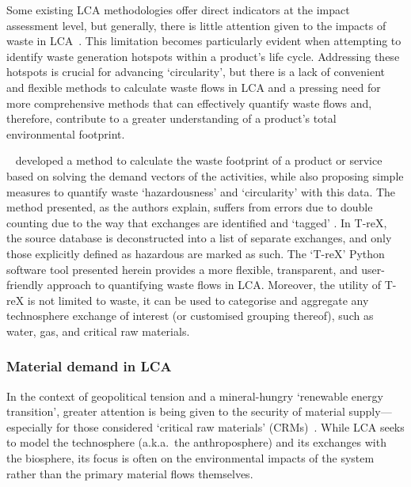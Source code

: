Some existing LCA methodologies offer direct indicators at the impact assessment level, but generally, there is little attention given to the impacts of waste in LCA~\citep{lauran2020abioticdepletion}. This limitation becomes particularly evident when attempting to identify waste generation hotspots within a product's life cycle. Addressing these hotspots is crucial for advancing `circularity', but there is a lack of convenient and flexible methods to calculate waste flows in LCA and a pressing need for more comprehensive methods that can effectively quantify waste flows and, therefore, contribute to a greater understanding of a product's total environmental footprint.

~\cite{laurenti2023wastefootprint} developed a method to calculate the waste footprint of a product or service based on solving the demand vectors of the activities, while also proposing simple measures to quantify waste `hazardousness' and `circularity' with this data. The method presented, as the authors explain, suffers from errors due to double counting due to the way that exchanges are identified and `tagged' . In T-reX, the source database is deconstructed into a list of separate exchanges, and only those explicitly defined as hazardous are marked as such. The `T-reX' Python software tool presented herein provides a more flexible, transparent, and user-friendly approach to quantifying waste flows in LCA\@. Moreover, the utility of T-reX is not limited to waste, it can be used to categorise and aggregate any technosphere exchange of interest (or customised grouping thereof), such as water, gas, and critical raw materials.

\subsubsection{Material demand in LCA}\label{sec:intro-material}

In the context of geopolitical tension and a mineral-hungry `renewable energy transition', greater attention is being given to the security of material supply---especially for those considered `critical raw materials' (CRMs)~\citep{eu2023crmstudy,hool2023crm,mancini2013supplysecurity,jrc2023supplychain,hartley2024cepolitics,salviulo2021supplychain,iea2023crm,iea2023energytechperspectives}. While LCA seeks to model the technosphere (a.k.a.\ the anthroposphere) and its exchanges with the biosphere, its focus is often on the environmental impacts of the system rather than the primary material flows themselves.

